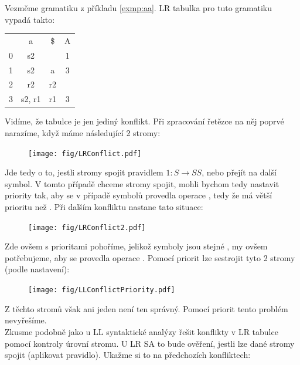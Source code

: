 \begin{exmp}
  Vezměme gramatiku z příkladu \ref{exmp:aa}. LR tabulka pro tuto gramatiku
  vypadá takto:
  \begin{table}[H]
    \centering
    \begin{tabular}{| c || c | c | c |}
      \hline
        &	a  &	\$ &	A \\
      \hhline{|=||=|=|=|}
      0 &	s2 &    & 1 \\
      \hline
      1	& s2 & a	& 3 \\
      \hline
      2	& r2 & r2 &   \\
      \hline
      3 & s2, r1& r1 & 3 \\
      \hline
    \end{tabular}
  \end{table}

  Vidíme, že tabulce je jen jediný konflikt. Při zpracování řetězce
   na něj poprvé narazíme, když máme následující 2 stromy:

  \begin{figure}[H]
    \centering
    \texttt{[image: fig/LRConflict.pdf]}
  \end{figure}

  Jde tedy o to, jestli stromy spojit pravidlem $1: S \rightarrow SS$, nebo přejít
  na další symbol. V tomto případě chceme stromy spojit, mohli bychom tedy
  nastavit priority tak, aby se v případě symbolů \symb{[S, a]} provedla operace
  , tedy že  má větší prioritu než . Při dalším konfliktu nastane
  tato situace:

  \begin{figure}[H]
    \centering
    \texttt{[image: fig/LRConflict2.pdf]}
  \end{figure}

  Zde ovšem s prioritami pohoříme, jelikož symboly jsou stejné \symb{[S, a]},
  my ovšem potřebujeme, aby se provedla operace . Pomocí priorit lze
  sestrojit tyto 2 stromy (podle nastavení):

  \begin{figure}[H]
    \centering
    \texttt{[image: fig/LLConflictPriority.pdf]}
  \end{figure}

  Z těchto stromů však ani jeden není ten správný. Pomocí priorit tento problém
  nevyřešíme.\\

  Zkusme podobně jako u LL syntaktické analýzy řešit konflikty v LR tabulce
  pomocí kontroly úrovní stromu. U LR SA to bude ověření, jestli lze
  dané stromy spojit (aplikovat pravidlo). Ukažme si to na předchozích
  konfliktech:


\end{exmp}
